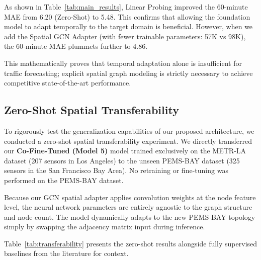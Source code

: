 \documentclass[11pt, a4paper]{article}
\begin{document}
As shown in Table~\ref{tab:main_results}, Linear Probing improved the 60-minute MAE from 6.20 (Zero-Shot) to 5.48. This confirms that allowing the foundation model to adapt temporally to the target domain is beneficial. However, when we add the Spatial GCN Adapter (with fewer trainable parameters: 57K vs 98K), the 60-minute MAE plummets further to 4.86. 

This mathematically proves that temporal adaptation alone is insufficient for traffic forecasting; explicit spatial graph modeling is strictly necessary to achieve competitive state-of-the-art performance.

\subsection{Zero-Shot Spatial Transferability}

To rigorously test the generalization capabilities of our proposed architecture, we conducted a zero-shot spatial transferability experiment. We directly transferred our \textbf{Co-Fine-Tuned (Model 5)} model trained exclusively on the METR-LA dataset (207 sensors in Los Angeles) to the unseen PEMS-BAY dataset (325 sensors in the San Francisco Bay Area). No retraining or fine-tuning was performed on the PEMS-BAY dataset.

Because our GCN spatial adapter applies convolution weights at the node feature level, the neural network parameters are entirely agnostic to the graph structure and node count. The model dynamically adapts to the new PEMS-BAY topology simply by swapping the adjacency matrix input during inference.

Table~\ref{tab:transferability} presents the zero-shot results alongside fully supervised baselines from the literature for context.
\end{document}

